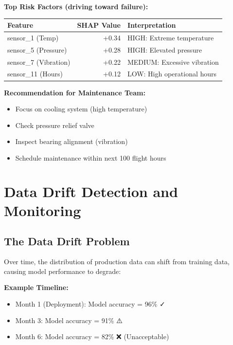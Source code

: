 \documentclass[11pt,a4paper]{article}
\begin{document}
\textbf{Top Risk Factors (driving toward failure):}
\begin{table}[H]
\centering
\begin{tabular}{|l|r|p{4cm}|}
\toprule
\textbf{Feature} & \textbf{SHAP Value} & \textbf{Interpretation} \\
\midrule
sensor\_1 (Temp) & +0.34 & HIGH: Extreme temperature \\
sensor\_5 (Pressure) & +0.28 & HIGH: Elevated pressure \\
sensor\_7 (Vibration) & +0.22 & MEDIUM: Excessive vibration \\
sensor\_11 (Hours) & +0.12 & LOW: High operational hours \\
\bottomrule
\end{tabular}
\end{table}

\textbf{Recommendation for Maintenance Team:}
\begin{itemize}
    \item Focus on cooling system (high temperature)
    \item Check pressure relief valve
    \item Inspect bearing alignment (vibration)
    \item Schedule maintenance within next 100 flight hours
\end{itemize}

\section{Data Drift Detection and Monitoring}

\subsection{The Data Drift Problem}

Over time, the distribution of production data can shift from training data, causing model performance to degrade:

\textbf{Example Timeline:}
\begin{itemize}
    \item Month 1 (Deployment): Model accuracy = 96\% ✓
    \item Month 3: Model accuracy = 91\% ⚠️
    \item Month 6: Model accuracy = 82\% ❌ (Unacceptable)
\end{itemize}
\end{document}

